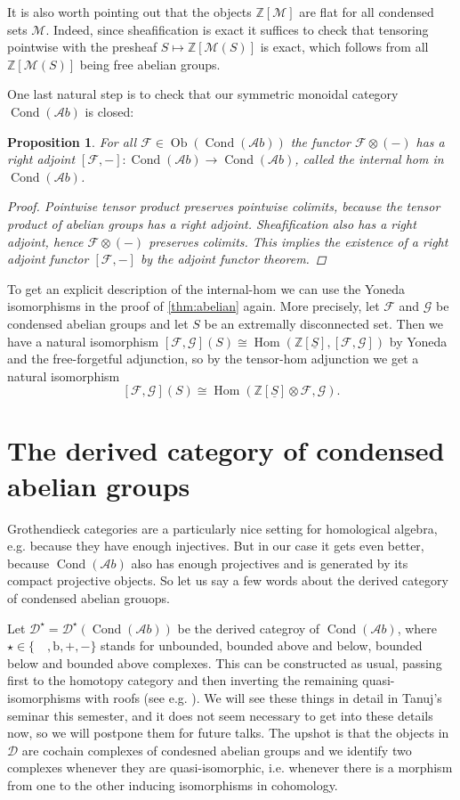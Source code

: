 \documentclass[11pt,A4]{article}
\theoremstyle{plain}
\newtheorem{prop}[thm]{Proposition}
\theoremstyle{definition}
\theoremstyle{remark}
\newcommand{\Z}{\mathbb{Z}}
\newcommand{\1}{\mathbbm{1}}
\newcommand{\F}{\mathcal{F}}
\newcommand{\G}{\mathcal{G}}
\newcommand{\M}{\mathcal{M}}
\newcommand{\Ab}{\mathscr{A}b}
\newcommand{\D}{\mathscr{D}}
\DeclareMathOperator{\Hom}{Hom}
\DeclareMathOperator{\Cond}{Cond}
\DeclareMathOperator{\Ob}{Ob}
\renewcommand{\u}[1]{\underline{#1}}
\newcommand{\ot}{\otimes}
\begin{document}
It is also worth pointing out that the objects $\Z[\M]$ are flat for all condensed sets $\M$.
Indeed, since sheafification is exact it suffices to check that tensoring pointwise with the presheaf $S\mapsto \Z[\M(S)]$ is exact, which follows from all $\Z[\M(S)]$ being free abelian groups.

One last natural step is to check that our symmetric monoidal category $\Cond(\Ab)$ is closed:

\begin{prop}
    For all $\F\in \Ob(\Cond(\Ab))$ the functor $\F\ot (-)$ has a right adjoint $[\F,-]\colon \Cond(\Ab)\to \Cond(\Ab)$, called the \textit{internal hom} in $\Cond(\Ab)$.
    \begin{proof}
	Pointwise tensor product preserves pointwise colimits, because the tensor product of abelian groups has a right adjoint.
	Sheafification also has a right adjoint, hence $\F\ot (-)$ preserves colimits.
	This implies the existence of a right adjoint functor $[\F,-]$ by the adjoint functor theorem.
    \end{proof}
\end{prop}

To get an explicit description of the internal-hom we can use the Yoneda isomorphisms in the proof of \cref{thm:abelian} again.
More precisely, let $\F$ and $\G$ be condensed abelian groups and let $S$ be an extremally disconnected set.
Then we have a natural isomorphism $[\F,\G](S)\cong \Hom(\Z[\u{S}],[\F,\G])$ by Yoneda and the free-forgetful adjunction, so by the tensor-hom adjunction we get a natural isomorphism
\[ [\F,\G](S)\cong \Hom(\Z[\u{S}]\ot \F,\G).\]

\section{The derived category of condensed abelian groups}

Grothendieck categories are a particularly nice setting for homological algebra, e.g. because they have enough injectives.
But in our case it gets even better, because $\Cond(\Ab)$ also has enough projectives and is generated by its compact projective objects.
So let us say a few words about the derived category of condensed abelian grouops.

Let $\D^{\star}=\D^{\star}(\Cond(\Ab))$ be the derived categroy of $\Cond(\Ab)$, where $\star\in \{\quad,\mathrm{b},+,-\}$ stands for unbounded, bounded above and below, bounded below and bounded above complexes.
This can be constructed as usual, passing first to the homotopy category and then inverting the remaining quasi-isomorphisms with roofs (see e.g. \cite{gm03}).
We will see these things in detail in Tanuj's seminar this semester, and it does not seem necessary to get into these details now, so we will postpone them for future talks.
The upshot is that the objects in $\D$ are cochain complexes of condesned abelian groups and we identify two complexes whenever they are quasi-isomorphic, i.e. whenever there is a morphism from one to the other inducing isomorphisms in cohomology.
\end{document}
